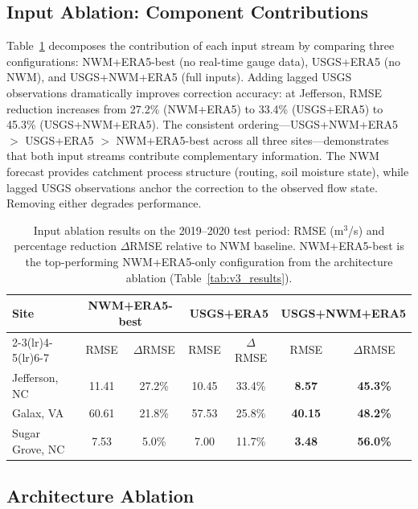 \documentclass[draft]{agujournal2019}
\begin{document}
\subsection{Input Ablation: Component Contributions}

Table~\ref{tab:input_ablation} decomposes the contribution of each input stream by comparing three configurations: NWM+ERA5-best (no real-time gauge data), USGS+ERA5 (no NWM), and USGS+NWM+ERA5 (full inputs). Adding lagged USGS observations dramatically improves correction accuracy: at Jefferson, RMSE reduction increases from 27.2\% (NWM+ERA5) to 33.4\% (USGS+ERA5) to 45.3\% (USGS+NWM+ERA5). The consistent ordering---USGS+NWM+ERA5 $>$ USGS+ERA5 $>$ NWM+ERA5-best across all three sites---demonstrates that both input streams contribute complementary information. The NWM forecast provides catchment process structure (routing, soil moisture state), while lagged USGS observations anchor the correction to the observed flow state. Removing either degrades performance.

\begin{table}
    \centering
    \caption{Input ablation results on the 2019--2020 test period: RMSE (m$^3$/s) and percentage reduction $\Delta$RMSE relative to NWM baseline. NWM+ERA5-best is the top-performing NWM+ERA5-only configuration from the architecture ablation (Table~\ref{tab:v3_results}).}
    \small
    \begin{tabular}{l cc cc cc}
        \toprule
        \textbf{Site} & \multicolumn{2}{c}{\textbf{NWM+ERA5-best}} & \multicolumn{2}{c}{\textbf{USGS+ERA5}} & \multicolumn{2}{c}{\textbf{USGS+NWM+ERA5}} \\
        \cmidrule(lr){2-3}\cmidrule(lr){4-5}\cmidrule(lr){6-7}
         & RMSE & $\Delta$RMSE & RMSE & $\Delta$RMSE & RMSE & $\Delta$RMSE \\
        \midrule
        Jefferson, NC   & 11.41 & 27.2\% & 10.45 & 33.4\% & \textbf{8.57}  & \textbf{45.3\%} \\
        Galax, VA       & 60.61 & 21.8\% & 57.53 & 25.8\% & \textbf{40.15} & \textbf{48.2\%} \\
        Sugar Grove, NC & 7.53  &  5.0\% & 7.00  & 11.7\% & \textbf{3.48}  & \textbf{56.0\%} \\
        \bottomrule
    \end{tabular}
    \label{tab:input_ablation}
\end{table}

\subsection{Architecture Ablation}
\end{document}
